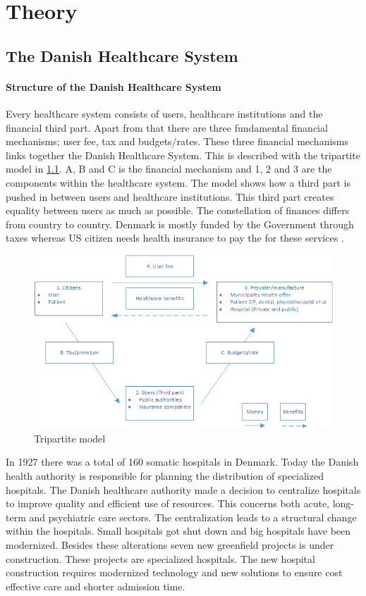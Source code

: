 \chapter{Theory}

\section{The Danish Healthcare System}
\subsubsection{Structure of the Danish Healthcare System}
Every healthcare system consists of users, healthcare institutions and the financial third part. Apart from that there are three fundamental financial mechanisms; user fee, tax and budgets/rates. These three financial mechanisms links together the Danish Healthcare System. This is described with the tripartite model in \cref{Trepartmodel}. A, B and C is the financial mechanism and 1, 2 and 3 are the components within the healthcare system. The model shows how a third part is pushed in between users and healthcare institutions. This third part creates equality between users as much as possible. The constellation of finances differs from country to country. Denmark is mostly funded by the Government through taxes whereas US citizen needs health insurance to pay the for these services \cite{sundhedsvaesen}. 


\begin{figure}[H]
\centering
\includegraphics[width=1\textwidth]{Figure/thirdpart.png}
\caption{Tripartite model \cite{sundhedsvaesen}}
\label{Trepartmodel}
\end{figure} 

In 1927 there was a total of 160 somatic hospitals in Denmark. Today the Danish health authority is responsible for planning the distribution of specialized hospitals. The Danish healthcare authority made a decision to centralize hospitals to improve quality and efficient use of resources. This concerns both acute, long-term and psychiatric care sectors.
The centralization leads to a structural change within the hospitals. Small hospitals got shut down and big hospitals have been modernized. Besides these alterations seven new greenfield projects is under construction. These projects are specialized hospitals. The new hospital construction requires modernized technology and new solutions to ensure cost effective care and shorter admission time. 

